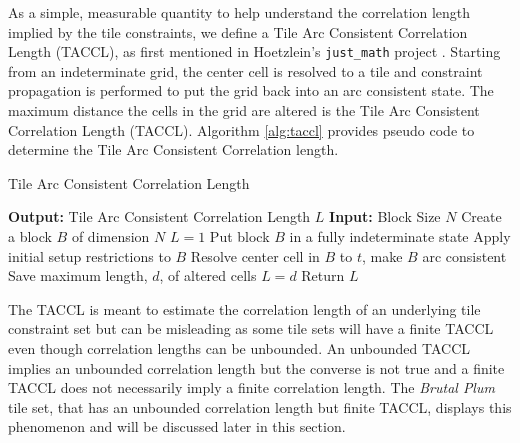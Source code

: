 As a simple, measurable quantity to help understand the correlation length implied by the tile constraints, we define a Tile Arc Consistent Correlation
Length (TACCL), as first mentioned in Hoetzlein's \texttt{just\_math} project \cite{Hoetzlein_2023}.
Starting from an indeterminate grid, the center cell is resolved to a tile and constraint propagation is performed to put the grid
back into an arc consistent state.
The maximum distance the cells in the grid are altered is the Tile Arc Consistent Correlation Length (TACCL).
Algorithm \ref{alg:taccl} provides pseudo code to determine the Tile Arc Consistent Correlation length.

\begin{algorithm}
  \caption{Tile Arc Consistent Correlation Length}
  \label{alg:taccl}
  \begin{algorithmic}
    \State \textbf{Output:} Tile Arc Consistent Correlation Length $L$
    \State \textbf{Input:} Block Size $N$
    \State Create a block $B$ of dimension $N$
    \State $L=1$
      \State Put block $B$ in a fully indeterminate state
      \State Apply initial setup restrictions to $B$
      \State Resolve center cell in $B$ to $t$, make $B$ arc consistent
      \State Save maximum length, $d$, of altered cells
        \State $L = d$
      \EndIf
    \EndFor
    \State Return $L$
  \end{algorithmic}
\end{algorithm}


The TACCL is meant to estimate the correlation length of an underlying tile constraint set but can be misleading as some
tile sets will have a finite TACCL even though correlation lengths can be unbounded.
An unbounded TACCL implies an unbounded correlation length but the converse is not true and a finite TACCL
does not necessarily imply a finite correlation length.
The \textit{Brutal Plum} tile set, that has an unbounded correlation length but finite TACCL,
displays this phenomenon and will be discussed later in this section.


%


